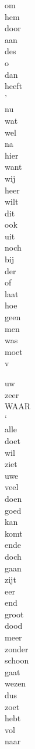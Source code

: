 \begin{minipage}[t]{0.25\textwidth}
	om\\
	hem\\
	door\\
	aan\\
	des\\
	o\\
	dan\\
	heeft\\
	’\\
	nu\\
	wat\\
	wel\\
	na\\
	hier\\
	want\\
	wij\\
	heer\\
	wilt\\
	dit\\
	ook\\
	uit\\
	noch\\
	bij\\
	der\\
	of\\
	laat\\
	hoe\\
	geen\\
	men\\
	was\\
	moet\\
	v\\
\end{minipage}
\begin{minipage}[t]{0.25\textwidth}
	uw\\
	zeer\\
	WAAR\\
	‘\\
	alle\\
	doet\\
	wil\\
	ziet\\
	uwe\\
	veel\\
	doen\\
	goed\\
	kan\\
	komt\\
	ende\\
	doch\\
	gaan\\
	zijt\\
	eer\\
	end\\
	groot\\
	dood\\
	meer\\
	zonder\\
	schoon\\
	gaat\\
	wezen\\
	dus\\
	zoet\\
	hebt\\
	vol\\
	naar\\
\end{minipage}

